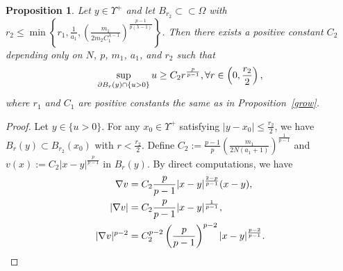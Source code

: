 \documentclass[10pt,a4paper]{amsart}
\newtheorem{proposition}{Proposition}
\begin{document}
	\begin{proposition}\label{nondegeneracy}
		Let $y \in \Upsilon^+$ and let $B_{r_2} \subset\subset \Omega$ with $	r_2 \leq \min\left\{r_1, \frac{1}{a_1} , \left(\frac{m_1}{2m_2 C_1^{\lambda-1}}\right)^{\frac{p-1}{p(\lambda-1)}}\right\}$. Then there exists a positive constant $C_2$ depending only on $N$, $p$, $m_1$, $a_1$, and $r_2$ such that
		\begin{align}
			\sup_{\partial B_r(y) \cap \{u > 0\}} u \geq C_2 r^{\frac{p}{p-1}},\forall r \in \left( 0, \frac{r_2}{2}\right) ,\notag
		\end{align}
		where $r_1$ and $C_1$ are positive constants the same as in Proposition~\ref{grow}.
	\end{proposition}

	\begin{proof}
		Let $y\in\{u>0\}$. For any $x_0\in\Upsilon^+$ satisfying $|y-x_{0}|\leq\frac{r_2}{2}$, we have $B_{r}(y)\subset B_{r_2}(x_{0})$ with $r<\frac{r_2}{2}$. Define $C_2:=\frac{p-1}{p}\left(\frac{m_1}{2N(a_1+1)}\right)^{\frac{1}{p-1}}$ and $v(x):=C_2|x-y|^{\frac{p}{p-1}}$ in $B_{r}(y)$. By  direct computations, we have
		\begin{align}
			\nabla v&=C_2\frac{p}{p-1}|x-y|^{\frac{2-p}{p-1}}(x-y),\notag\\
			|\nabla v|&=C_2\frac{p}{p-1}|x-y|^{\frac{1}{p-1}},\notag\\
			|\nabla v|^{p-2}&=C_2^{p-2}\left( \frac{p}{p-1}\right) ^{p-2}|x-y|^{\frac{p-2}{p-1}}\notag.
		\end{align}
		

\end{proof}
\end{document}
